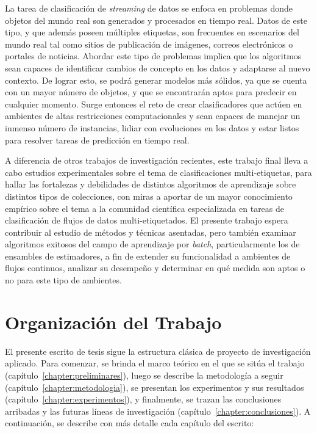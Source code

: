 La tarea de clasificación de \textit{streaming} de datos se enfoca en problemas
donde objetos del mundo real son generados y procesados en tiempo real. Datos de
este tipo, y que además poseen múltiples etiquetas, son frecuentes en escenarios
del mundo real tal como sitios de publicación de imágenes, correos electrónicos
o portales de noticias. Abordar este tipo de problemas implica que los
algoritmos sean capaces de identificar cambios de concepto en los datos y
adaptarse al nuevo contexto. De lograr esto, se podrá generar modelos más
sólidos, ya que se cuenta con un mayor número de objetos, y que se encontrarán
aptos para predecir en cualquier momento. Surge entonces el reto de crear
clasificadores que actúen en ambientes de altas restricciones computacionales y
sean capaces de manejar un inmenso número de instancias, lidiar con evoluciones
en los datos y estar listos para resolver tareas de predicción en tiempo real.

A diferencia de otros trabajos de investigación recientes, este trabajo final
lleva a cabo estudios experimentales sobre el tema de clasificaciones
multi-etiquetas, para hallar las fortalezas y debilidades de distintos
algoritmos de aprendizaje sobre distintos tipos de colecciones, con miras a
aportar de un mayor conocimiento empírico sobre el tema a la comunidad
científica especializada en tareas de clasificación de flujos de datos
multi-etiquetados. El presente trabajo espera contribuir al estudio de métodos y
técnicas asentadas, pero también examinar algoritmos exitosos del campo de
aprendizaje por \textit{batch}, particularmente los de ensambles de estimadores,
a fin de extender su funcionalidad a ambientes de flujos continuos, analizar su
desempeño y determinar en qué medida son aptos o no para este tipo de ambientes.


\section{Organización del Trabajo}

El presente escrito de tesis sigue la estructura clásica de proyecto de
investigación aplicado. Para comenzar, se brinda el marco teórico en el que se
sitúa el trabajo (capítulo~\ref{chapter:preliminares}), luego se describe la
metodología a seguir (capítulo~\ref{chapter:metodologia}), se presentan los
experimentos y sus resultados (capítulo~\ref{chapter:experimentos}), y
finalmente, se trazan las conclusiones arribadas y las futuras líneas de
investigación (capítulo~\ref{chapter:conclusiones}). A continuación, se describe
con más detalle cada capítulo del escrito:


